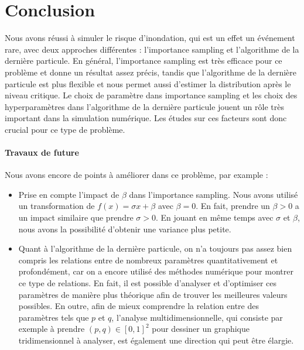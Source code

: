 \documentclass{article}
\begin{document}
\section{Conclusion}
Nous avons réussi à simuler le risque d'inondation, qui est un effet un événement rare, avec deux approches différentes : l'importance sampling et l'algorithme de la dernière particule. En général, l'importance sampling est très efficace pour ce problème et donne un résultat assez précis, tandis que l'algorithme de la dernière particule est plus flexible et nous permet aussi d'estimer la distribution après le niveau critique. Le choix de paramètre dans importance sampling et les choix des hyperparamètres dans l'algorithme de la dernière particule jouent un rôle très important dans la simulation numérique. Les études sur ces facteurs sont donc crucial pour ce type de problème.
\paragraph{Travaux de future} Nous avons encore de points à améliorer dans ce problème, par example : 
\begin{itemize}
    \item Prise en compte l'impact de $\beta$ dans l'importance sampling. Nous avons utilisé un transformation de $f(x)=\sigma x+\beta$ avec $\beta =0$. En fait, prendre un $\beta>0$ a un impact similaire que prendre $\sigma>0$. En jouant en même temps avec $\sigma$ et $\beta$, nous avons la possibilité  d'obtenir une variance plus petite.
    \item Quant à l'algorithme de la dernière particule, on n'a toujours pas assez bien compris les relations entre de nombreux paramètres quantitativement et profondément, car on a encore utilisé des méthodes numérique pour montrer ce type de relations. En fait, il est possible d'analyser et d'optimiser ces paramètres de manière plus théorique afin de trouver les meilleures valeurs possibles. En outre, afin de mieux comprendre la relation entre des paramètres tels que $p$ et $q$, l'analyse multidimensionnelle, qui consiste par exemple à prendre $(p,q)\in [0,1]^2$ pour dessiner un graphique tridimensionnel à analyser, est également une direction qui peut être élargie.
\end{itemize}

\newpage
\end{document}
